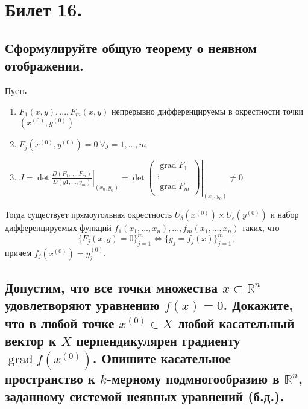 \section{Билет 16.}

\subsection{Сформулируйте общую теорему о неявном отображении.}
\begin{theorem}
    Пусть
    \begin{enumerate}
        \item $F_1(x,y), ..., F_m(x,y)$ непрерывно дифференцируемы в окрестности точки $(x^{(0)}, y^{(0)})$
        \item $F_j(x^{(0)}, y^{(0)})=0 \> \forall j = 1, ..., m$
        \item $J = \left.
            \det \frac{D(F_1, ..., F_m)}{D(y1, ..., y_m)} 
        \right|_{(x_0, y_0)} = \left.
            \det \begin{pmatrix}
                \operatorname{grad} F_1 \\
                \vdots \\
                \operatorname{grad} F_m \\
            \end{pmatrix}
        \right|_{(x_0, y_0)} \neq 0$
    \end{enumerate}
    Тогда существует прямоугольная окрестность $U_\delta(x^{(0)}) \times U_\epsilon(y^{(0)})$ и набор дифференцируемых функций $f_1(x_1, ..., x_n), ..., f_m(x_1, ..., x_n)$ таких, что 
    \[
        \{
            F_j(x,y) = 0
        \}_{j=1}^m
        \Leftrightarrow
        \{
            y_j = f_j(x)
        \}_{j=1}^m,
    \]
    причем $f_j(x^{(0)}) = y_j^{(0)}$.
\end{theorem}

\subsection{Допустим, что все точки множества $x \subset \mathbb{R}^n$ удовлетворяют уравнению $f(x) = 0$. Докажите, что в любой точке $x^{(0)} \in X$ любой касательный вектор к $X$ перпендикулярен градиенту $\operatorname{grad} f(x^{(0)})$. Опишите касательное пространство к $k$-мерному подмногообразию в $\mathbb{R}^n$, заданному системой неявных уравнений (б.д.).}